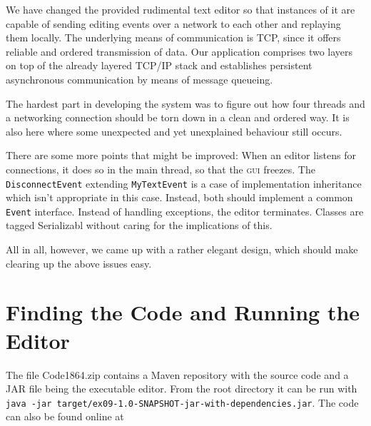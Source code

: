 \documentclass[a4paper,draft,12pt,oneside,article,table]{memoir}
\newcommand{\mil}[1]{\texttt{#1}}
\begin{document}
We have changed the provided rudimental text editor so that instances of
it are capable of sending editing events over a network to each other
and replaying them locally. The underlying means of communication is
TCP, since it offers reliable and ordered transmission of data. Our
application comprises two layers on top of the already layered TCP/IP
stack and establishes persistent asynchronous communication by means of
message queueing.

The hardest part in developing the system was to figure out how four
threads and a networking connection should be torn down in a clean and
ordered way. It is also here where some unexpected and yet unexplained
behaviour still occurs.

There are some more points that might be improved: When an editor
listens for connections, it does so in the main thread, so that the
\textsc{gui} freezes. The \mil{DisconnectEvent} extending
\mil{MyTextEvent} is a case of implementation inheritance which isn't
appropriate in this case. Instead, both should implement a common
\mil{Event} interface. Instead of handling exceptions, the editor
terminates. Classes are tagged Serializabl without caring for the
implications of this.

All in all, however, we came up with a rather elegant design, which
should make clearing up the above issues easy.

\appendix

\chapter{Finding the Code and Running the Editor}

The file Code1864.zip contains a Maven repository with the source code
and a JAR file being the executable editor. From the root directory it
can be run with \mil{java -jar
target/ex09-1.0-SNAPSHOT-jar-with-dependencies.jar}.
The code can also be found online at 

\end{document}
